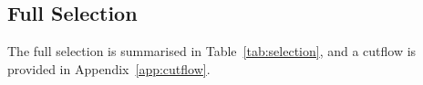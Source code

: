 \documentclass[NOTE, atlasdraft=true, texlive=2017, UKenglish]{\ATLASLATEXPATH atlasdoc}
\begin{document}
\subsection{Full Selection}
\label{sec:finalselection}

The full selection is summarised in Table~\ref{tab:selection}, and a cutflow is provided in Appendix~\ref{app:cutflow}.

\end{document}
